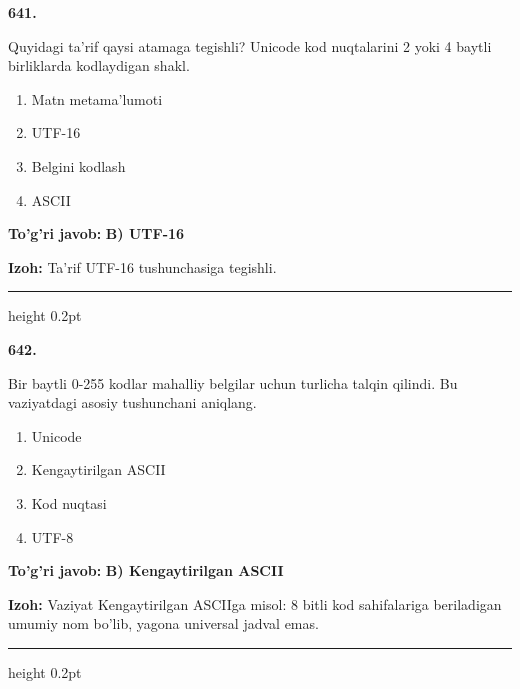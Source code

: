 \documentclass[10pt,a4paper,oneside]{article}
\begin{document}
\noindent\textbf{\color{ink}641.}
\par
Quyidagi ta'rif qaysi atamaga tegishli? Unicode kod nuqtalarini 2 yoki 4 baytli birliklarda kodlaydigan shakl.
\begin{enumerate}[label=\Alph*),leftmargin=9mm]
\item Matn metama'lumoti
\item UTF-16
\item Belgini kodlash
\item ASCII
\end{enumerate}
\begin{tcolorbox}[enhanced,breakable,colback=teal!4,colframe=teal!50!black,boxrule=0.5pt,arc=1.1mm,left=3mm,right=3mm,top=1.7mm,bottom=1.7mm,before skip=2mm,after skip=2mm]
\textbf{\color{teal}To'g'ri javob:} \textbf{B) UTF-16}
\par\smallskip
\textbf{Izoh:} Ta'rif UTF-16 tushunchasiga tegishli.
\end{tcolorbox}
\vspace{2mm}\hrule height 0.2pt \vspace{3mm}

\noindent\textbf{\color{ink}642.}
\par
Bir baytli 0-255 kodlar mahalliy belgilar uchun turlicha talqin qilindi. Bu vaziyatdagi asosiy tushunchani aniqlang.
\begin{enumerate}[label=\Alph*),leftmargin=9mm]
\item Unicode
\item Kengaytirilgan ASCII
\item Kod nuqtasi
\item UTF-8
\end{enumerate}
\begin{tcolorbox}[enhanced,breakable,colback=teal!4,colframe=teal!50!black,boxrule=0.5pt,arc=1.1mm,left=3mm,right=3mm,top=1.7mm,bottom=1.7mm,before skip=2mm,after skip=2mm]
\textbf{\color{teal}To'g'ri javob:} \textbf{B) Kengaytirilgan ASCII}
\par\smallskip
\textbf{Izoh:} Vaziyat Kengaytirilgan ASCIIga misol: 8 bitli kod sahifalariga beriladigan umumiy nom bo'lib, yagona universal jadval emas.
\end{tcolorbox}
\vspace{2mm}\hrule height 0.2pt \vspace{3mm}
\end{document}
